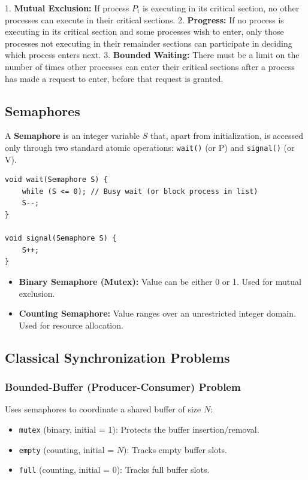 \documentclass[12pt,a4paper]{article}
\begin{document}
\begin{tcolorbox}[defbox, title={\textbf{Three Requirements for a Critical Section Solution}}]
1. \textbf{Mutual Exclusion:} If process $P_i$ is executing in its critical section, no other processes can execute in their critical sections.
2. \textbf{Progress:} If no process is executing in its critical section and some processes wish to enter, only those processes not executing in their remainder sections can participate in deciding which process enters next.
3. \textbf{Bounded Waiting:} There must be a limit on the number of times other processes can enter their critical sections after a process has made a request to enter, before that request is granted.
\end{tcolorbox}

\subsection{Semaphores}
A \textbf{Semaphore} is an integer variable $S$ that, apart from initialization, is accessed only through two standard atomic operations: \texttt{wait()} (or P) and \texttt{signal()} (or V).

\begin{tcolorbox}[formulabox, title={\textbf{Semaphore Atomic Implementations}}]
\begin{verbatim}
void wait(Semaphore S) {
    while (S <= 0); // Busy wait (or block process in list)
    S--;
}

void signal(Semaphore S) {
    S++;
}
\end{verbatim}
\begin{itemize}[leftmargin=*, itemsep=3pt]
  \item \textbf{Binary Semaphore (Mutex):} Value can be either 0 or 1. Used for mutual exclusion.
  \item \textbf{Counting Semaphore:} Value ranges over an unrestricted integer domain. Used for resource allocation.
\end{itemize}
\end{tcolorbox}

\subsection{Classical Synchronization Problems}

\subsubsection{Bounded-Buffer (Producer-Consumer) Problem}
Uses semaphores to coordinate a shared buffer of size $N$:
\begin{itemize}[leftmargin=*, itemsep=3pt]
  \item \texttt{mutex} (binary, initial = 1): Protects the buffer insertion/removal.
  \item \texttt{empty} (counting, initial = $N$): Tracks empty buffer slots.
  \item \texttt{full} (counting, initial = 0): Tracks full buffer slots.
\end{itemize}
\end{document}
